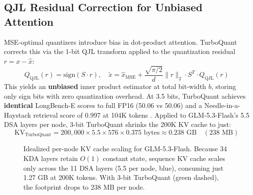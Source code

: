 \documentclass[11pt,a4paper]{article}
\begin{document}
\subsection{QJL Residual Correction for Unbiased Attention}
MSE-optimal quantizers introduce bias in dot-product attention. TurboQuant corrects this via the 1-bit QJL transform \cite{qjl} applied to the quantization residual $r = x - \hat{x}$:
\begin{equation}
    Q_{\text{QJL}}(r) = \text{sign}(S \cdot r), \quad \tilde{x} = \hat{x}_{\text{MSE}} + \frac{\sqrt{\pi/2}}{d} \|r\|_2 \cdot S^T \cdot Q_{\text{QJL}}(r)
\end{equation}
This yields an \textbf{unbiased} inner product estimator at total bit-width $b$, storing only sign bits with zero quantization overhead. At 3.5 bits, TurboQuant achieves \textbf{identical} LongBench-E scores to full FP16 (50.06 vs 50.06) and a Needle-in-a-Haystack retrieval score of 0.997 at 104K tokens \cite{turboquant}. Applied to GLM-5.3-Flash's 5.5 DSA layers per node, 3-bit TurboQuant shrinks the 200K KV cache to just:
\begin{equation}
    \text{KV}_{\text{TurboQuant}} = 200{,}000 \times 5.5 \times 576 \times 0.375 \text{ bytes} \approx 0.238 \text{ GB} \quad (238 \text{ MB})
\end{equation}

\begin{figure}[ht!]
\centering
{}
\caption{Idealized per-node KV cache scaling for GLM-5.3-Flash. Because 34 KDA layers retain $O(1)$ constant state, sequence KV cache scales only across the 11 DSA layers (5.5 per node, blue), consuming just 1.27 GB at 200K tokens. With 3-bit TurboQuant (green dashed), the footprint drops to 238 MB per node.}
\label{fig:kvcache}
\end{figure}
\end{document}
